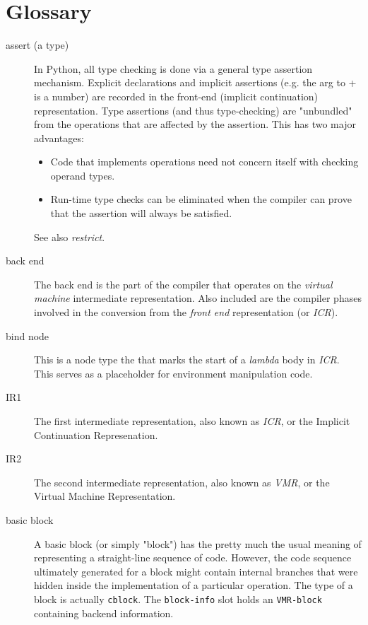 \chapter{Glossary}%


\begin{description}
\item[assert (a type)]
In Python, all type checking is done via a general type assertion
mechanism.  Explicit declarations and implicit assertions (e.g. the arg to
+ is a number) are recorded in the front-end (implicit continuation)
representation.  Type assertions (and thus type-checking) are "unbundled"
from the operations that are affected by the assertion.  This has two major
advantages:
\begin{itemize}
\item Code that implements operations need not concern itself with checking
operand types.

\item Run-time type checks can be eliminated when the compiler can prove that
the assertion will always be satisfied.
\end{itemize}
See also {\it restrict}.

\item[back end] The back end is the part of the compiler that operates on the
{\it virtual machine} intermediate representation.  Also included are the
compiler phases involved in the conversion from the {\it front end}
representation (or {\it ICR}).

\item[bind node] This is a node type the that marks the start of a {\it lambda}
body in {\it ICR}.  This serves as a placeholder for environment manipulation
code.

\item[IR1] The first intermediate representation, also known as {\it ICR}, or
the Implicit Continuation Represenation.

\item[IR2] The second intermediate representation, also known as {\it VMR}, or
the Virtual Machine Representation.

\item[basic block] A basic block (or simply "block") has the pretty much the
usual meaning of representing a straight-line sequence of code.  However, the
code sequence ultimately generated for a block might contain internal branches
that were hidden inside the implementation of a particular operation.  The type
of a block is actually {\tt cblock}.  The {\tt block-info} slot holds an 
{\tt VMR-block} containing backend information.


\end{description}
